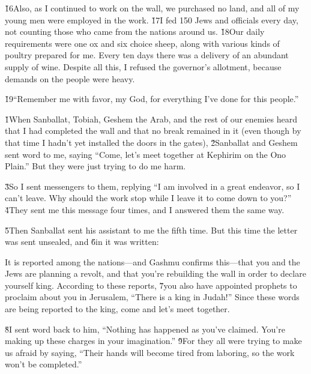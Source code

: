 \v{16}Also, as I continued to work on the wall, we purchased no land, and all of my young men were employed in the work. \v{17}I fed 150 Jews and officials every day, not counting those who came from the nations around us. \v{18}Our daily requirements were one ox and six choice sheep, along with various kinds of poultry prepared for me. Every ten days there was a delivery of an abundant supply of wine. Despite all this, I refused the governor's allotment, because demands on the people were heavy.

\v{19}``Remember me with favor, my God, for everything I've done for this people.''

\v{1}When Sanballat, Tobiah, Geshem the Arab, and the rest of our enemies heard that I had completed the wall and that no break remained in it (even though by that time I hadn't yet installed the doors in the gates), \v{2}Sanballat and Geshem sent word to me, saying ``Come, let's meet together at Kephirim on the Ono Plain.'' But they were just trying to do me harm.

\v{3}So I sent messengers to them, replying ``I am involved in a great endeavor, so I can't leave. Why should the work stop while I leave it to come down to you?'' \v{4}They sent me this message four times, and I answered them the same way.

\v{5}Then Sanballat sent his assistant to me the fifth time. But this time the letter was sent unsealed, and \v{6}in it was written:

\begin{poetry}
\poeml It is reported among the nations---and Gashmu confirms this---that you and the Jews are planning a revolt, and that you're rebuilding the wall in order to declare yourself king. According to these reports, \v{7}you also have appointed prophets to proclaim about you in Jerusalem, ``There is a king in Judah!'' Since these words are being reported to the king, come and let's meet together.
\end{poetry}

\v{8}I sent word back to him, ``Nothing has happened as you've claimed. You're making up these charges in your imagination.'' \v{9}For they all were trying to make us afraid by saying, ``Their hands will become tired from laboring, so the work won't be completed.''

